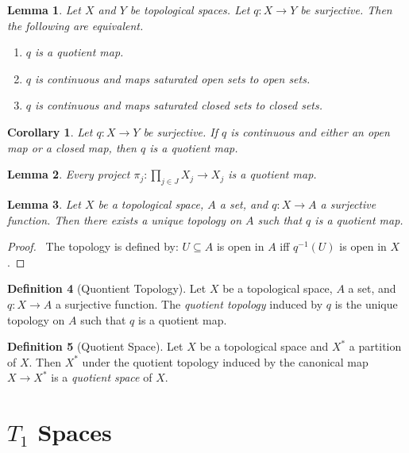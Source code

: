 \documentclass{book}
\let\qed\relax
\newtheorem{lm}{Lemma}[chapter]
\newtheorem{cor}{Corollary}[lm]
\theoremstyle{definition}
\newtheorem{df}[lm]{Definition}
\newcommand{\inv}[1]{\ensuremath{{#1}^{-1}}}
\begin{document}
  \begin{lm}
    Let $X$ and $Y$ be topological spaces.
    Let $q : X \rightarrow Y$ be surjective. Then the following are equivalent.
    \begin{enumerate}
      \item $q$ is a quotient map.
      \item $q$ is continuous and maps saturated open sets to open sets.
      \item $q$ is continuous and maps saturated closed sets to closed sets.
    \end{enumerate}
  \end{lm}
  
  \begin{cor}
    Let $q : X \rightarrow Y$ be surjective. If $q$ is continuous and either an 
    open map or a closed map, then $q$ is a quotient map.
  \end{cor}
  
  \begin{lm}
    Every project $\pi_j : \prod_{j \in J} X_j \rightarrow X_j$ is a quotient 
    map.
  \end{lm}
  
  \begin{lm}
    Let $X$ be a topological space, $A$ a set, and $q : X \rightarrow A$ a 
    surjective function. Then there exists a unique topology on $A$ such that 
    $q$ 
    is a quotient map.
  \end{lm}
  
  \begin{proof}
    \pf\ The topology is defined by: $U \subseteq A$ is open in $A$ iff 
    $\inv{q}(U)$ is open in $X$. \qed
  \end{proof}
  
  \begin{df}[Quontient Topology]
    Let $X$ be a topological space, $A$ a set, and $q : X \rightarrow A$ a 
    surjective function. The \emph{quotient topology} induced by $q$ is the 
    unique 
    topology on $A$ such that $q$ is a quotient map.
  \end{df}
  
  \begin{df}[Quotient Space]
    Let $X$ be a topological space and $X^*$ a partition of $X$. Then $X^*$ 
    under 
    the quotient topology induced by the canonical map $X \rightarrow X^*$ is a 
    \emph{quotient space} of $X$.
  \end{df}
  
  \section{$T_1$ Spaces}
  
\end{document}
